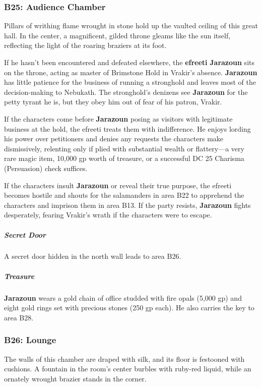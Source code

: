 \documentclass[10pt,a4paper,twoside,bg=print,twocolumn,openany,nodeprecatedcode]{dndbook}
\begin{document}
\subsubsection{B25: Audience Chamber}
\begin{DndReadAloud}{}
Pillars of writhing flame wrought in stone hold up the vaulted ceiling of this great hall. In the center, a magnificent, gilded throne gleams like the sun itself, reflecting the light of the roaring braziers at its foot.

\end{DndReadAloud}

If he hasn't been encountered and defeated elsewhere, the \textbf{efreeti} \textbf{Jarazoun} sits on the throne, acting as master of Brimstone Hold in Vrakir's absence. \textbf{Jarazoun} has little patience for the business of running a stronghold and leaves most of the decision-making to Nebukath. The stronghold's denizens see \textbf{Jarazoun} for the petty tyrant he is, but they obey him out of fear of his patron, Vrakir.

If the characters come before \textbf{Jarazoun} posing as visitors with legitimate business at the hold, the efreeti treats them with indifference. He enjoys lording his power over petitioners and denies any requests the characters make dismissively, relenting only if plied with substantial wealth or flattery—a very rare magic item, 10,000 gp worth of treasure, or a successful DC 25 Charisma (Persuasion) check suffices.

If the characters insult \textbf{Jarazoun} or reveal their true purpose, the efreeti becomes hostile and shouts for the salamanders in area B22 to apprehend the characters and imprison them in area B13. If the party resists, \textbf{Jarazoun} fights desperately, fearing Vrakir's wrath if the characters were to escape.

\subparagraph{Secret Door}
A secret door hidden in the north wall leads to area B26.

\subparagraph{Treasure}
\textbf{Jarazoun} wears a gold chain of office studded with fire opals (5,000 gp) and eight gold rings set with precious stones (250 gp each). He also carries the key to area B28.

\subsubsection{B26: Lounge}
\begin{DndReadAloud}{}
The walls of this chamber are draped with silk, and its floor is festooned with cushions. A fountain in the room's center burbles with ruby-red liquid, while an ornately wrought brazier stands in the corner.

\end{DndReadAloud}
\end{document}
